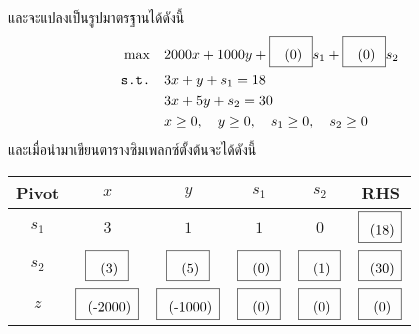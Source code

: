\begin{solution}
\begin{multicols}{2}
    และจะแปลงเป็นรูปมาตรฐานได้ดังนี้
    \begin{align*}
        \max \quad & 2000x + 1000y + \blank[0]{0.5cm}s_1+ \blank[0]{0.5cm}s_2\\
        \texttt{s.t.} \quad
        & 3x + y + s_1 = 18 \\
        & 3x + 5y + s_2 = 30 \\
        & x \geq 0, \quad y \geq 0, \quad s_1 \geq 0, \quad s_2 \geq 0 
    \end{align*}
    และเมื่อนำมาเขียนตารางซิมเพลกซ์ตั้งต้นจะได้ดังนี้
    \begin{center}
        \begin{tabular}{|c|cccc|c|}
            \hline
            \textbf{Pivot} & $x$ & $y$ &  $s_1$ & $s_2$ &  \textbf{RHS} \\
            \hline
            $s_1$ & $3$ & $1$  & $1$ & $0$ & $\blank[18]{0.5cm}$ \\
            $s_2$ & $\blank[3]{0.5cm}$ & $\blank[5]{0.5cm}$  & $\blank[0]{0.5cm}$ & $\blank[1]{0.5cm}$ & $\blank[30]{0.5cm}$ \\
            \hline
            $z$   & $\blank[-2000]{1cm}$ & $\blank[-1000]{1cm}$  & $\blank[0]{0.5cm}$ & $\blank[0]{0.5cm}$ & $\blank[0]{0.5cm}$ \\
            \hline
        \end{tabular}
    \end{center}
\end{multicols}


\end{solution}
